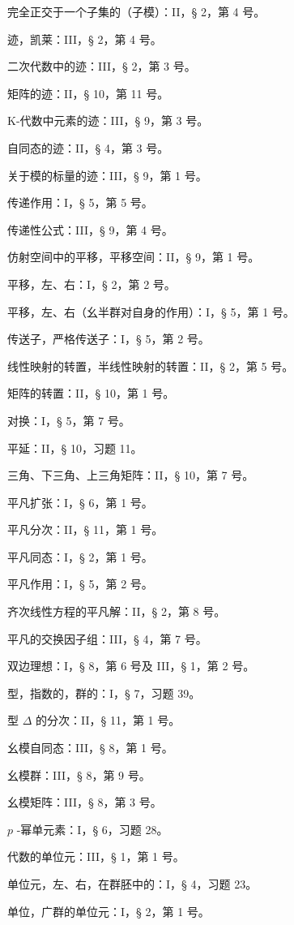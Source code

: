 完全正交于一个子集的（子模）：II，§ 2，第 4 号。

迹，凯莱：III，§ 2，第 4 号。

二次代数中的迹：III，§ 2，第 3 号。

矩阵的迹：II，§ 10，第 11 号。

K-代数中元素的迹：III，§ 9，第 3 号。

自同态的迹：II，§ 4，第 3 号。

关于模的标量的迹：III，§ 9，第 1 号。

传递作用：I，§ 5，第 5 号。

传递性公式：III，§ 9，第 4 号。

仿射空间中的平移，平移空间：II，§ 9，第 1 号。

平移，左、右：I，§ 2，第 2 号。

平移，左、右（幺半群对自身的作用）：I，§ 5，第 1 号。

传送子，严格传送子：I，§ 5，第 2 号。

线性映射的转置，半线性映射的转置：II，§ 2，第 5 号。

矩阵的转置：II，§ 10，第 1 号。

对换：I，§ 5，第 7 号。

平延：II，§ 10，习题 11。

三角、下三角、上三角矩阵：II，§ 10，第 7 号。

平凡扩张：I，§ 6，第 1 号。

平凡分次：II，§ 11，第 1 号。

平凡同态：I，§ 2，第 1 号。

平凡作用：I，§ 5，第 2 号。

齐次线性方程的平凡解：II，§ 2，第 8 号。

平凡的交换因子组：III，§ 4，第 7 号。

双边理想：I，§ 8，第 6 号及 III，§ 1，第 2 号。

型，指数的，群的：I，§ 7，习题 39。

型 \(\Delta\) 的分次：II，§ 11，第 1 号。

幺模自同态：III，§ 8，第 1 号。

幺模群：III，§ 8，第 9 号。

幺模矩阵：III，§ 8，第 3 号。

\(p\) -幂单元素：I，§ 6，习题 28。

代数的单位元：III，§ 1，第 1 号。

单位元，左、右，在群胚中的：I，§ 4，习题 23。

单位，广群的单位元：I，§ 2，第 1 号。

